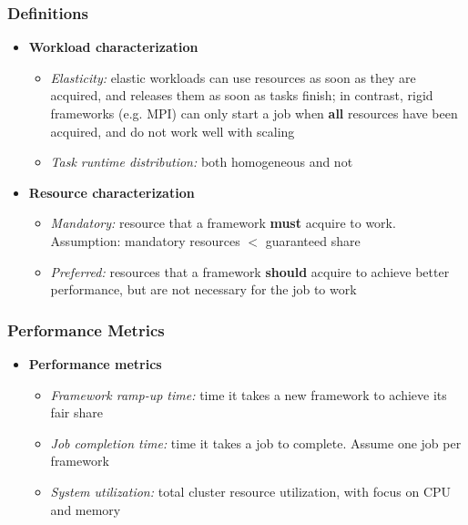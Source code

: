 \begin{frame}
\frametitle{Definitions}
\begin{itemize}
	\item {\bf Workload characterization}
	\begin{itemize}
		\item {\it Elasticity:} elastic workloads can use resources as soon as they are acquired, and releases them as soon as tasks finish; in contrast, rigid frameworks (e.g. MPI) can only start a job when {\bf all} resources have been acquired, and do not work well with scaling
		\item {\it Task runtime distribution:} both homogeneous and not
	\end{itemize}

\vspace{20pt}

	\item {\bf Resource characterization}
	\begin{itemize}
		\item {\it Mandatory:} resource that a framework {\bf must} acquire to work. Assumption: mandatory resources $<$ guaranteed share
		\item {\it Preferred:} resources that a framework {\bf should} acquire to achieve better performance, but are not necessary for the job to work
	\end{itemize}
\end{itemize}
\end{frame}

\begin{frame}
\frametitle{Performance Metrics}
\begin{itemize}
	\item {\bf Performance metrics}
	\begin{itemize}
		\item {\it Framework ramp-up time:} time it takes a new framework to achieve its fair share
		\item {\it Job completion time:} time it takes a job to complete. Assume one job per framework
		\item {\it System utilization:} total cluster resource utilization, with focus on CPU and memory
	\end{itemize}
\end{itemize}
\end{frame}

